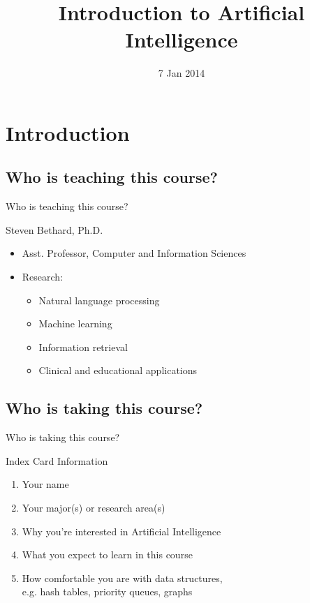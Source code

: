 \documentclass[14pt]{beamer}
\title{Introduction to Artificial Intelligence}
\date[]{7 Jan 2014}
\begin{document}
\begin{frame}
  \titlepage
\end{frame}

\section*{Introduction}

\subsection*{Who is teaching this course?}
\begin{frame}{Who is teaching this course?}
	\begin{block}{Steven Bethard, Ph.D.}
		\begin{itemize}
			\item Asst. Professor, Computer and Information Sciences
			\item Research:
				\begin{itemize}
					\item Natural language processing
					\item Machine learning
					\item Information retrieval
					\item Clinical and educational applications
				\end{itemize}
		\end{itemize}
	\end{block}
\end{frame}

\subsection*{Who is taking this course?}
\begin{frame}{Who is taking this course?}
	\begin{block}{Index Card Information}
		\begin{enumerate}
			\item Your name
			\item Your major(s) or research area(s)
			\item Why you're interested in Artificial Intelligence
			\item What you expect to learn in this course
			\item How comfortable you are with data structures, \\
			      e.g. hash tables, priority queues, graphs
		\end{enumerate}
	\end{block}
\end{frame}
\end{document}
